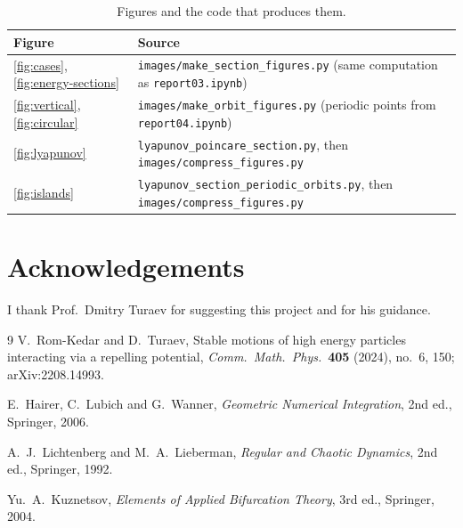 \documentclass[11pt,a4paper]{article}
\begin{document}
\begin{table}[H]
\centering
\caption{Figures and the code that produces them.}
\label{tab:repro}
\begin{tabular}{@{}ll@{}}
\toprule
Figure & Source\\
\midrule
\ref{fig:cases}, \ref{fig:energy-sections} & \texttt{images/make\_section\_figures.py} (same computation as \texttt{report03.ipynb})\\
\ref{fig:vertical}, \ref{fig:circular} & \texttt{images/make\_orbit\_figures.py} (periodic points from \texttt{report04.ipynb})\\
\ref{fig:lyapunov} & \texttt{lyapunov\_poincare\_section.py}, then \texttt{images/compress\_figures.py}\\
\ref{fig:islands} & \texttt{lyapunov\_section\_periodic\_orbits.py}, then \texttt{images/compress\_figures.py}\\
\bottomrule
\end{tabular}
\end{table}

\section*{Acknowledgements}
I thank Prof.\ Dmitry Turaev for suggesting this project and for his guidance.

\begin{thebibliography}{9}
V.~Rom-Kedar and D.~Turaev,
Stable motions of high energy particles interacting via a repelling potential,
\emph{Comm.\ Math.\ Phys.}\ \textbf{405} (2024), no.~6, 150;
arXiv:2208.14993.

E.~Hairer, C.~Lubich and G.~Wanner,
\emph{Geometric Numerical Integration}, 2nd ed., Springer, 2006.

A.~J.~Lichtenberg and M.~A.~Lieberman,
\emph{Regular and Chaotic Dynamics}, 2nd ed., Springer, 1992.

Yu.~A.~Kuznetsov, \emph{Elements of Applied Bifurcation Theory}, 3rd ed.,
Springer, 2004.
\end{thebibliography}
\end{document}
